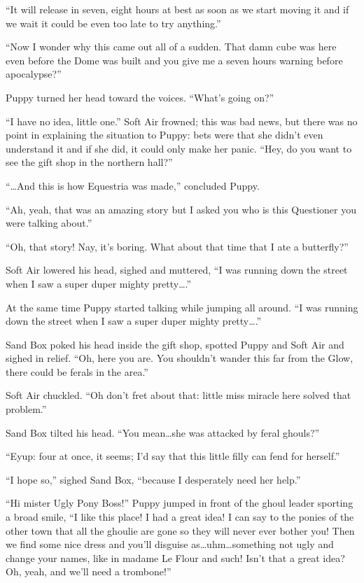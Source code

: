 ``It will release in seven, eight hours at best as soon as we start moving it and if we wait it could be even too late to try anything.''

``Now I wonder why this came out all of a sudden. That damn cube was here even before the Dome was built and you give me a seven hours warning before apocalypse?''

Puppy turned her head toward the voices. ``What's going on?''

``I have no idea, little one.'' Soft Air frowned; this was bad news, but there was no point in explaining the situation to Puppy: bets were that she didn't even understand it and if she did, it could only make her panic. ``Hey, do you want to see the gift shop in the northern hall?''

\horizonline


``\dots And this is how Equestria was made,'' concluded Puppy.

``Ah, yeah, that was an amazing story but I asked you who is this Questioner you were talking about.''

``Oh, that story! Nay, it's boring. What about that time that I ate a butterfly?''

Soft Air lowered his head, sighed and muttered, ``I was running down the street when I saw a super duper mighty pretty\dots.''

At the same time Puppy started talking while jumping all around. ``I was running down the street when I saw a super duper mighty pretty\dots.''

\horizonline


Sand Box poked his head inside the gift shop, spotted Puppy and Soft Air and sighed in relief. ``Oh, here you are. You shouldn't wander this far from the Glow, there could be ferals in the area.''

Soft Air chuckled. ``Oh don't fret about that: little miss miracle here solved that problem.''

Sand Box tilted his head. ``You mean\dots she was attacked by feral ghouls?''

``Eyup: four at once, it seems; I'd say that this little filly can fend for herself.''

``I hope so,'' sighed Sand Box, ``because I desperately need her help.''

``Hi mister Ugly Pony Boss!'' Puppy jumped in front of the ghoul leader sporting a broad smile, ``I like this place! I had a great idea! I can say to the ponies of the other town that all the ghoulie are gone so they will never ever bother you! Then we find some nice dress and you'll disguise as\dots uhm\dots something not ugly and change your names, like in madame Le Flour and such! Isn't that a great idea? Oh, yeah, and we'll need a trombone!''

